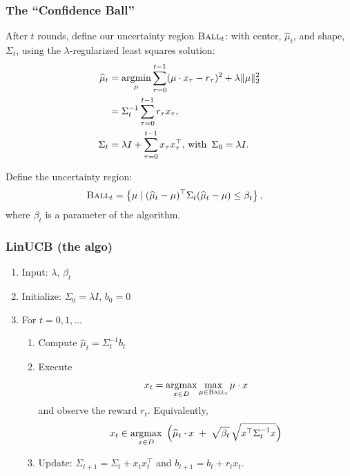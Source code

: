 \documentclass[aspectratio=169]{beamer}
\begin{document}
\begin{frame}
\frametitle{The ``Confidence Ball''}

After $t$ rounds, define our uncertainty region 
$\textsc{Ball}_t$: with center, $\widehat{\mu}_t$, and shape,
$\Sigma_t$, using the $\lambda$-regularized least squares solution:
\begin{align*}%
\widehat{\mu}_t &= \argmin_{\mu} \sum_{\tau = 0}^{t-1}
( \mu \cdot x_\tau - r_\tau )^2 + \lambda\|\mu\|_2^2\\
&= \Sigma_t^{-1}\sum_{\tau = 0}^{t-1}r_\tau x_\tau,\\
\Sigma_t &= \lambda I + \sum_{\tau = 0}^{t-1}x_\tau x_\tau^\top,
\, \mathrm{with } \, \, \, \Sigma_0 = \lambda I.
\end{align*}

\pause
Define the uncertainty region:
\begin{align*}
\textsc{Ball}_{t} &= \left\{ \mu \mid
(\widehat \mu_t - \mu)^\top\Sigma_t(\widehat \mu_t - \mu)
\leq \beta_t \right\},  
\end{align*}
where $\beta_t$ is a parameter of the algorithm.

\end{frame}

\begin{frame}
  
\frametitle{LinUCB (the algo)}

\begin{enumerate}
\item Input: $\lambda$, $\beta_t$
\item Initialize: $\Sigma_0 = \lambda I$, $b_0 = 0$
  \item For $t=0,1, \ldots$
    \begin{enumerate} 
    \item Compute $\widehat{\mu}_t = \Sigma_t^{-1} b_t$
    \item Execute 
    \[
    x_t = \operatorname*{argmax}_{x\in D}\max_{\mu\in \textsc{Ball}_t} \mu\cdot x 
    \]
    and observe the reward $r_t$.
    \pause    Equivalently,
    \[
    x_t \in \operatorname*{argmax}_{x\in D}\ \Big( \widehat{\mu}_t\cdot x \;+\; \sqrt{\beta_t}\,\sqrt{x^\top \Sigma_t^{-1}x}\Big)
    \]   
  \pause \item Update: $\Sigma_{t+1} = \Sigma_t + x_t x_t^\top$ and $b_{t+1} = b_t + r_t x_t$.
  \end{enumerate}
\end{enumerate}

\end{frame}
\end{document}
